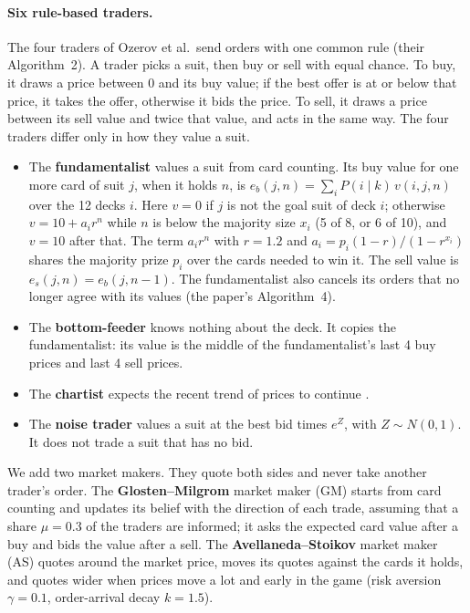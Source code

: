 \documentclass[10pt]{article}
\begin{document}
\paragraph{Six rule-based traders.} The four traders of Ozerov et al.\ send orders with one common rule (their
Algorithm~2). A trader picks a suit, then buy or sell with equal chance. To buy, it draws a price between 0 and its buy
value; if the best offer is at or below that price, it takes the offer, otherwise it bids the price. To sell, it draws a
price between its sell value and twice that value, and acts in the same way. The four traders differ only in how they
value a suit.
\begin{itemize}
\item The \textbf{fundamentalist} values a suit from card counting. Its buy value for one more card of suit $j$, when
it holds $n$, is $e_b(j,n) = \sum_{i} P(i \mid k)\, v(i,j,n)$ over the 12 decks $i$. Here $v = 0$ if $j$ is not the goal
suit of deck $i$; otherwise $v = 10 + a_i r^n$ while $n$ is below the majority size $x_i$ (5 of 8, or 6 of 10), and
$v = 10$ after that. The term $a_i r^n$ with $r = 1.2$ and $a_i = p_i(1-r)/(1-r^{x_i})$ shares the majority prize
$p_i$ over the cards needed to win it. The sell value is $e_s(j,n) = e_b(j,n-1)$. The fundamentalist also cancels its
orders that no longer agree with its values (the paper's Algorithm~4).
\item The \textbf{bottom-feeder} knows nothing about the deck. It copies the fundamentalist: its value is the middle of
the fundamentalist's last 4 buy prices and last 4 sell prices.
\item The \textbf{chartist} expects the recent trend of prices to continue \cite{chiarella}.
\item The \textbf{noise trader} values a suit at the best bid times $e^{Z}$, with $Z \sim N(0,1)$. It does not trade a
suit that has no bid.
\end{itemize}
We add two market makers. They quote both sides and never take another trader's order. The \textbf{Glosten--Milgrom}
market maker (GM) \cite{gm} starts from card counting and updates its belief with the direction of each trade, assuming
that a share $\mu = 0.3$ of the traders are informed; it asks the expected card value after a buy and bids the value
after a sell. The \textbf{Avellaneda--Stoikov} market maker (AS) \cite{as} quotes around the market price, moves its
quotes against the cards it holds, and quotes wider when prices move a lot and early in the game (risk aversion
$\gamma = 0.1$, order-arrival decay $k = 1.5$).
\end{document}
